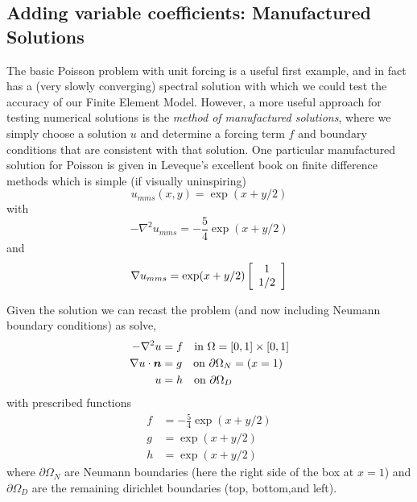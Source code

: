 \pagebreak
\subsection{Adding variable coefficients: Manufactured Solutions}
\label{sec:manuf-solut}

The basic Poisson problem with unit forcing is a useful first example,
and in fact has a (very slowly converging) spectral solution with
which we could test the accuracy of our Finite Element Model.
However, a more useful approach for testing numerical solutions is the
\emph{method of manufactured solutions}, where we simply choose a
solution $u$ and determine a forcing term $f$ and boundary conditions
that are consistent with that solution.  One particular manufactured
solution for Poisson is given in Leveque's excellent book on finite
difference methods \cite{leveque_finite_2007} which is simple (if
visually uninspiring)
\begin{equation}
  \label{eq:13}
  u_{mms}(x,y) = \exp(x + y/2)
\end{equation}
with
\begin{equation}
  \label{eq:14}
  -\nabla^{2} u_{mms} = -\frac{5}{4}\exp(x+y/2)
\end{equation}
and
\begin{equation}
  \label{eq:15}
  \nabla u_{mms} = \exp(x+y/2)
  \left[
    \begin{array}{c}
 1 \\
1/2\\
\end{array}
  \right]
\end{equation}

Given the solution we can recast the problem (and now including
Neumann boundary conditions) as solve,
\begin{align}
  \label{eq:16}
-\nabla^2u &= f \quad\text{in } \Omega=[0,1]\times[0,1] \nonumber\\
\nabla u\cdot{\mbox{\boldmath$n$}} & = g \quad\text{on } \partial\Omega_{N}=(x=1)\\
 u &= h \quad\text{on } \partial\Omega_{D}\nonumber
\end{align}
with  prescribed functions
\begin{align}
  \label{eq:17}
  f &= -\frac{5}{4}\exp(x+y/2)\nonumber\\
  g & = \exp(x+y/2)\\
  h &=  \exp(x+y/2)\nonumber
\end{align}
where $\partial\Omega_{N}$ are Neumann boundaries (here the right side
of the box at $x=1$) and $\partial\Omega_{D}$ are the remaining dirichlet boundaries (top, bottom,and left).

